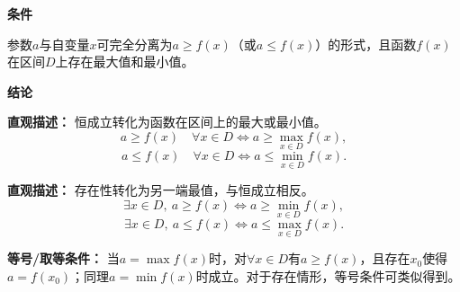\begin{statementbox}

	\textbf{\textcolor{CStatement}{条件}}
	\begin{description}[style=nextline, leftmargin=2.8em, labelsep=0.5em, itemsep=0.35em]
		\item[\textbf{\textcolor{CStatement}{条件 1（参数可分离）：}}] 参数$a$与自变量$x$可完全分离为$a \ge f(x)$（或$a \le f(x)$）的形式，且函数$f(x)$在区间$D$上存在最大值和最小值。
	\end{description}

	\textbf{\textcolor{CStatement}{结论}}
	\begin{description}[style=nextline, leftmargin=2.8em, labelsep=0.5em, itemsep=0.45em]
		\item[\textbf{\textcolor{CStatement}{结论一（恒成立转化）：}}]
			\textbf{\textcolor{CStatement}{直观描述：}}
			恒成立转化为函数在区间上的最大或最小值。
			\[
				a \ge f(x)\quad \forall x\in D \iff a \ge \max_{x\in D} f(x),
			\]
			\[
				a \le f(x)\quad \forall x\in D \iff a \le \min_{x\in D} f(x).
			\]

		\item[\textbf{\textcolor{CStatement}{常见变形（存在性问题）：}}]
			\textbf{\textcolor{CStatement}{直观描述：}}
			存在性转化为另一端最值，与恒成立相反。
			\[
				\exists x\in D,\ a \ge f(x) \iff a \ge \min_{x\in D} f(x),
			\]
			\[
				\exists x\in D,\ a \le f(x) \iff a \le \max_{x\in D} f(x).
			\]
	\end{description}

	\medskip
	\textbf{\textcolor{CStatement}{等号/取等条件：}}
	当$a = \max f(x)$时，对$\forall x\in D$有$a \ge f(x)$，且存在$x_0$使得$a = f(x_0)$；同理$a = \min f(x)$时成立。对于存在情形，等号条件可类似得到。

\end{statementbox}
